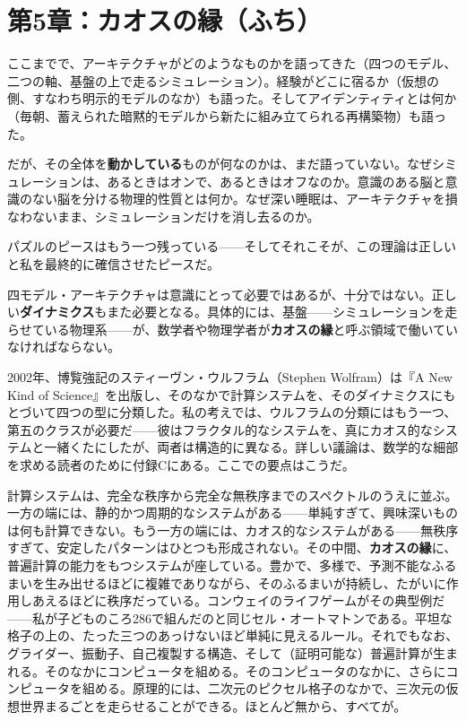 \documentclass[11pt, twoside, openright]{book}
\begin{document}
\chapter*{第5章：カオスの縁（ふち）}

ここまでで、アーキテクチャがどのようなものかを語ってきた（四つのモデル、二つの軸、基盤の上で走るシミュレーション）。経験がどこに宿るか（仮想の側、すなわち明示的モデルのなか）も語った。そしてアイデンティティとは何か（毎朝、蓄えられた暗黙的モデルから新たに組み立てられる再構築物）も語った。

だが、その全体を\textbf{動かしている}ものが何なのかは、まだ語っていない。なぜシミュレーションは、あるときはオンで、あるときはオフなのか。意識のある脳と意識のない脳を分ける物理的性質とは何か。なぜ深い睡眠は、アーキテクチャを損なわないまま、シミュレーションだけを消し去るのか。

パズルのピースはもう一つ残っている------そしてそれこそが、この理論は正しいと私を最終的に確信させたピースだ。

四モデル・アーキテクチャは意識にとって必要ではあるが、十分ではない。正しい\textbf{ダイナミクス}もまた必要となる。具体的には、基盤------シミュレーションを走らせている物理系------が、数学者や物理学者が\textbf{カオスの縁}と呼ぶ領域で働いていなければならない。

2002年、博覧強記のスティーヴン・ウルフラム（Stephen Wolfram）は『A New Kind of Science』を出版し、そのなかで計算システムを、そのダイナミクスにもとづいて四つの型に分類した。私の考えでは、ウルフラムの分類にはもう一つ、第五のクラスが必要だ------彼はフラクタル的なシステムを、真にカオス的なシステムと一緒くたにしたが、両者は構造的に異なる。詳しい議論は、数学的な細部を求める読者のために付録Cにある。ここでの要点はこうだ。

計算システムは、完全な秩序から完全な無秩序までのスペクトルのうえに並ぶ。一方の端には、静的かつ周期的なシステムがある------単純すぎて、興味深いものは何も計算できない。もう一方の端には、カオス的なシステムがある------無秩序すぎて、安定したパターンはひとつも形成されない。その中間、\textbf{カオスの縁}に、普遍計算の能力をもつシステムが座している。豊かで、多様で、予測不能なふるまいを生み出せるほどに複雑でありながら、そのふるまいが持続し、たがいに作用しあえるほどに秩序だっている。コンウェイのライフゲームがその典型例だ------私が子どものころ286で組んだのと同じセル・オートマトンである。平坦な格子の上の、たった三つのあっけないほど単純に見えるルール。それでもなお、グライダー、振動子、自己複製する構造、そして（証明可能な）普遍計算が生まれる。そのなかにコンピュータを組める。そのコンピュータのなかに、さらにコンピュータを組める。原理的には、二次元のピクセル格子のなかで、三次元の仮想世界まるごとを走らせることができる。ほとんど無から、すべてが。
\end{document}
